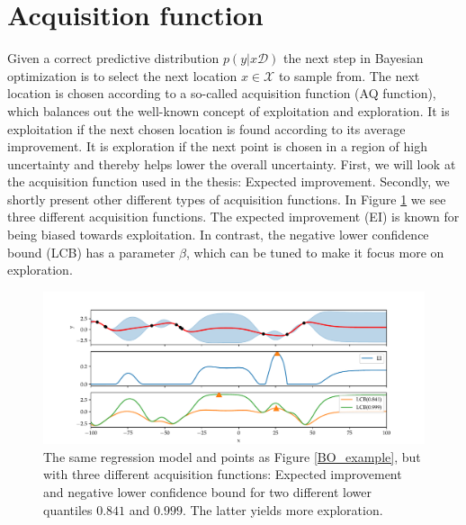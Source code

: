 \section{Acquisition function}
Given a correct predictive distribution $p(y|x\mathcal{D})$ the next step in Bayesian optimization
is to select the next location $x \in \mathcal{X}$ to sample from. The next location is chosen
according to a so-called acquisition function (AQ function), which balances out the well-known
concept of exploitation and exploration. It is exploitation if the next chosen location is found
according to its average improvement. It is exploration if the next point is chosen in a region of
high uncertainty and thereby helps lower the overall uncertainty. First, we will look at the
acquisition function used in the thesis: Expected improvement. Secondly, we shortly present other
different types of acquisition functions. In Figure \ref{Different_AQ_functions} we see three
different acquisition functions. The expected improvement (EI) is known for being biased towards
exploitation. In contrast, the negative lower confidence bound (LCB) has a parameter $\beta$, which
can be tuned to make it focus more on exploration. 
\begin{figure}[H]
    \centering
    \includegraphics[trim=1cm 0cm 1cm 1cm,clip,width=\textwidth]{Pictures/illustration_AQs.pdf}
    \caption{The same regression model and points as Figure \ref{BO_example}, but with three
    different acquisition functions: Expected improvement and negative lower confidence bound for
    two different lower quantiles $0.841$ and $0.999$. The latter yields more exploration.}\label{Different_AQ_functions}
\end{figure}

